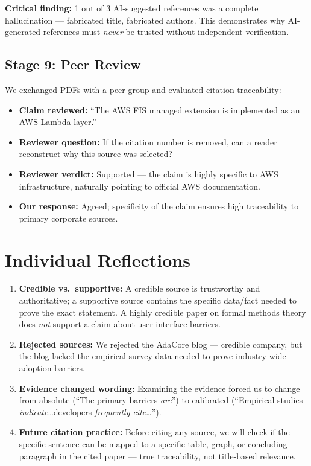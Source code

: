 \documentclass[11pt, a4paper]{article}
\begin{document}
\noindent\textbf{Critical finding:} 1 out of 3 AI-suggested references was a complete hallucination --- fabricated title, fabricated authors. This demonstrates why AI-generated references must \emph{never} be trusted without independent verification.

\subsection{Stage 9: Peer Review}
We exchanged PDFs with a peer group and evaluated citation traceability:

\begin{itemize}[nosep]
    \item \textbf{Claim reviewed:} ``The AWS FIS managed extension is implemented as an AWS Lambda layer.''
    \item \textbf{Reviewer question:} If the citation number is removed, can a reader reconstruct why this source was selected?
    \item \textbf{Reviewer verdict:} Supported --- the claim is highly specific to AWS infrastructure, naturally pointing to official AWS documentation.
    \item \textbf{Our response:} Agreed; specificity of the claim ensures high traceability to primary corporate sources.
\end{itemize}

\section{Individual Reflections}

\begin{enumerate}[nosep]
    \item \textbf{Credible vs.\ supportive:} A credible source is trustworthy and authoritative; a supportive source contains the specific data/fact needed to prove the exact statement. A highly credible paper on formal methods theory does \emph{not} support a claim about user-interface barriers.
    
    \item \textbf{Rejected sources:} We rejected the AdaCore blog --- credible company, but the blog lacked the empirical survey data needed to prove industry-wide adoption barriers.
    
    \item \textbf{Evidence changed wording:} Examining the evidence forced us to change from absolute (``The primary barriers \textit{are}'') to calibrated (``Empirical studies \textit{indicate}\ldots developers \textit{frequently cite}\ldots'').
    
    \item \textbf{Future citation practice:} Before citing any source, we will check if the specific sentence can be mapped to a specific table, graph, or concluding paragraph in the cited paper --- true traceability, not title-based relevance.
\end{enumerate}
\end{document}
